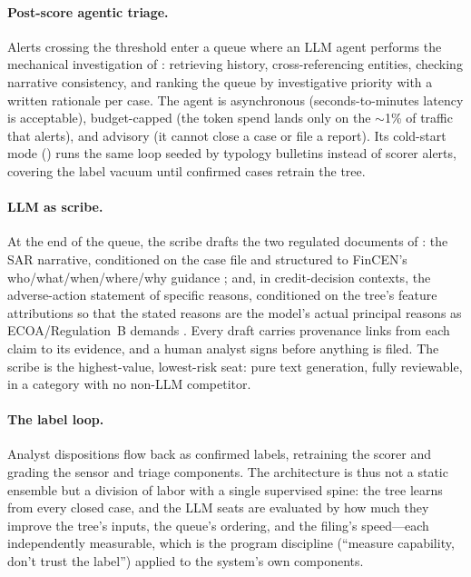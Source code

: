 \paragraph{Post-score agentic triage.} Alerts crossing the threshold enter a
queue where an LLM agent performs the mechanical investigation of
: retrieving history, cross-referencing entities,
checking narrative consistency, and ranking the queue by investigative
priority with a written rationale per case. The agent is asynchronous
(seconds-to-minutes latency is acceptable), budget-capped (the token spend
lands only on the $\sim$1\% of traffic that alerts), and advisory (it cannot
close a case or file a report). Its cold-start mode ()
runs the same loop seeded by typology bulletins instead of scorer alerts,
covering the label vacuum until confirmed cases retrain the tree.

\paragraph{LLM as scribe.} At the end of the queue, the scribe drafts the two
regulated documents of : the SAR narrative,
conditioned on the case file and structured to FinCEN's
who/what/when/where/why guidance \citep{fincen2003sarnarrative}; and, in
credit-decision contexts, the adverse-action statement of specific reasons,
conditioned on the tree's feature attributions so that the stated reasons are
the model's actual principal reasons as ECOA/Regulation~B demands
\citep{cfr1002_9, cfpb2022circular}. Every draft carries provenance links from
each claim to its evidence, and a human analyst signs before anything is
filed. The scribe is the highest-value, lowest-risk seat: pure text
generation, fully reviewable, in a category with no non-LLM competitor.

\paragraph{The label loop.} Analyst dispositions flow back as confirmed
labels, retraining the scorer and grading the sensor and triage components.
The architecture is thus not a static ensemble but a division of labor with a
single supervised spine: the tree learns from every closed case, and the LLM
seats are evaluated by how much they improve the tree's inputs, the queue's
ordering, and the filing's speed---each independently measurable, which is the
program discipline (``measure capability, don't trust the label'') applied to
the system's own components.

